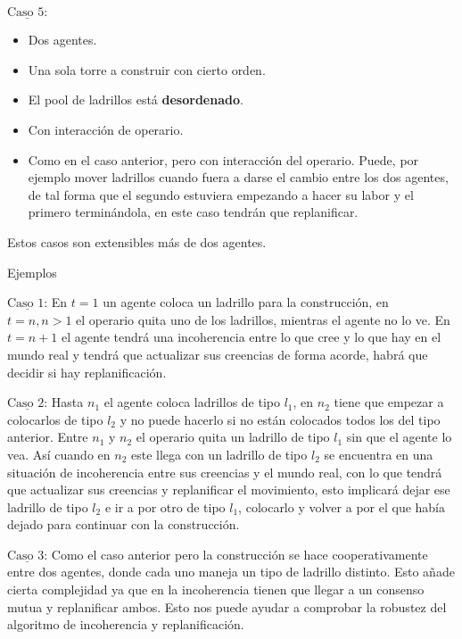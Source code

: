 \documentclass[12pt]{report}
\newcommand{\textunderline}[1]{$\underline{\mbox{#1}}$} %
\newcommand{\mksection}[1]{{\large {\color{NavyBlue} #1}}}
\begin{document}
  \textunderline{Caso 5:}
    \begin{itemize}
      \item Dos agentes.
      \item Una sola torre a construir con cierto orden.
      \item El pool de ladrillos est\'a \textbf{desordenado}.
      \item Con interacci\'on de operario.
      \item Como en el caso anterior, pero con interacci\'on del operario. Puede, por ejemplo mover ladrillos cuando fuera a darse el cambio entre los dos agentes, de tal forma que el segundo estuviera empezando a hacer su labor y el primero termin\'andola, en este caso tendr\'an que replanificar.
    \end{itemize}

  Estos casos son extensibles m\'as de dos agentes.

\mksection{Ejemplos} 

  \textunderline{Caso 1:} En $t = 1$ un agente coloca un ladrillo para la construcci\'on, en $t = n, n > 1$ el operario quita uno de los ladrillos, mientras el agente no lo ve. En $t = n + 1$ el agente tendr\'a una incoherencia entre lo que cree y lo que hay en el mundo real y tendr\'a que actualizar sus creencias de forma acorde, habr\'a que decidir si hay replanificaci\'on.

  \textunderline{Caso 2:} Hasta $n_{1}$ el agente coloca ladrillos de tipo $l_{1}$, en $n_{2}$ tiene que empezar a colocarlos de tipo $l_{2}$ y no puede hacerlo si no est\'an colocados todos los del tipo anterior. Entre $n_{1}$ y $n_{2}$ el operario quita un ladrillo de tipo $l_{1}$ sin que el agente lo vea. As\'i cuando en $n_{2}$ este llega con un ladrillo de tipo $l_{2}$ se encuentra en una situaci\'on de incoherencia entre sus creencias y el mundo real, con lo que tendr\'a que actualizar sus creencias y replanificar el movimiento, esto implicar\'a dejar ese ladrillo de tipo $l_{2}$ e ir a por otro de tipo $l_{1}$, colocarlo y volver a por el que hab\'ia dejado para continuar con la construcci\'on.

  \textunderline{Caso 3:} Como el caso anterior pero la construcci\'on se hace cooperativamente entre dos agentes, donde cada uno maneja un tipo de ladrillo distinto. Esto a\~nade cierta complejidad ya que en la incoherencia tienen que llegar a un consenso mutua y replanificar ambos. Esto nos puede ayudar a comprobar la robustez del algoritmo de incoherencia y replanificaci\'on.
\end{document}
